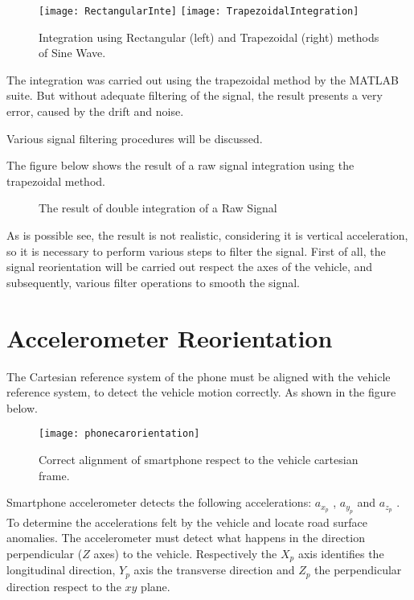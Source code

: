 \documentclass[tesi]{subfiles}
\begin{document}
\begin{figure}[H]
\centering
\texttt{[image: RectangularInte]}
\hspace{0.5cm}
\texttt{[image: TrapezoidalIntegration]}
\caption{Integration using Rectangular (left) and Trapezoidal (right) methods of Sine Wave.}
\label{fig:Rectangular and Trapezoidal Integration}
\end{figure}

The integration was carried out using the trapezoidal method by the MATLAB suite. But without adequate filtering of the signal, the result presents a very error, caused by the drift and noise. 

Various signal filtering procedures will be discussed. 

The figure below shows the result of a raw signal integration using the  trapezoidal method.

\begin{figure}[H]
  \centering
 \end{figure}
\begin{figure}[H]
  \centering

\centering
  \caption{The result of double integration of a Raw Signal}
  \label{fig:Integration of Raw Data}
\end{figure}

As is possible see, the result is not realistic, considering it is vertical acceleration, so it is necessary to perform various steps to filter the signal. First of all, the signal reorientation will be carried out respect the axes of the vehicle, and subsequently, various filter operations to smooth the signal.
\clearpage
\section{Accelerometer Reorientation} \label{sc:Accelerometer Reorientation}
The Cartesian reference system of the phone must be aligned with the vehicle reference system, to detect the vehicle motion correctly.
As shown in the figure below.

\begin{figure}[H]
  \centering
  \texttt{[image: phonecarorientation]}  
  \caption{Correct alignment of smartphone respect to the vehicle cartesian frame.}
  \label{fig:Smartphone cartesian frame alignment respect Car axis.}
\end{figure}
\noindent Smartphone accelerometer detects the following accelerations: $a_{x_{p}}$ , $a_{y_{p}}$ and $a_{z_{p}}$ . To determine the accelerations felt by the vehicle and locate road surface anomalies. The accelerometer must detect what happens in the direction perpendicular ($Z$ axes) to the vehicle\cite{mohan2008nericell}.
Respectively the $X_{p}$ axis identifies the longitudinal direction, $Y_{p}$ axis the transverse direction and $Z_{p}$ the perpendicular direction respect to the $xy$ plane.
\end{document}
